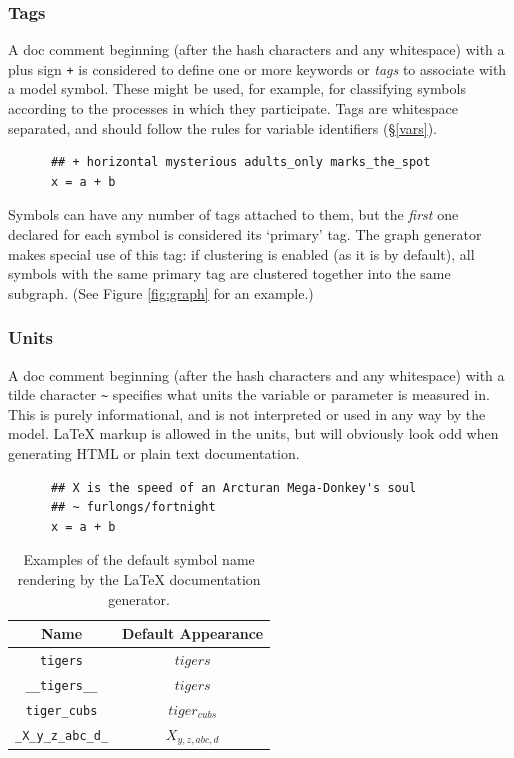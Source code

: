 \documentclass[a4paper,11pt]{article}
\begin{document}
\subsubsection*{Tags}\label{model:tags}
A doc comment beginning (after the hash characters and any whitespace) with a plus sign \texttt{+} is considered to define one or more keywords or \textit{tags} to associate with a model symbol. These might be used, for example, for classifying symbols according to the processes in which they participate. Tags are whitespace separated, and should follow the rules for variable identifiers (\S\ref{vars}).
\begin{verbatim}
      ## + horizontal mysterious adults_only marks_the_spot
      x = a + b
\end{verbatim}
Symbols can have any number of tags attached to them, but the \textit{first} one declared for each symbol is considered its `primary' tag. The graph generator makes special use of this tag: if clustering is enabled (as it is by default), all symbols with the same primary tag are clustered together into the same subgraph. (See Figure \ref{fig:graph} for an example.)

\subsubsection*{Units}\label{model:units}
A doc comment beginning (after the hash characters and any whitespace) with a tilde character \texttt{\~} specifies what units the variable or parameter is measured in. This is purely informational, and is not interpreted or used in any way by the model. \LaTeX{} markup is allowed in the units, but will obviously look odd when generating HTML or plain text documentation.
\begin{verbatim}
      ## X is the speed of an Arcturan Mega-Donkey's soul
      ## ~ furlongs/fortnight
      x = a + b
\end{verbatim}

\begin{table}[tbp]
\begin{center}
\begin{tabular}{| c | c |}
\hline
Name					& Default Appearance \\
\hline
\texttt{tigers}				& $tigers$ \\
\texttt{\_\_tigers\_\_}			& $tigers$ \\
\texttt{tiger\_cubs}			& $tiger_{cubs}$ \\
\texttt{\_X\_y\_z\_abc\_d\_}	& $X_{y,z,abc,d}$ \\
\hline
\end{tabular}
\end{center}
\caption{Examples of the default symbol name rendering by the \LaTeX{} documentation generator.}
\label{tab:latex:default}
\end{table}
\end{document}
